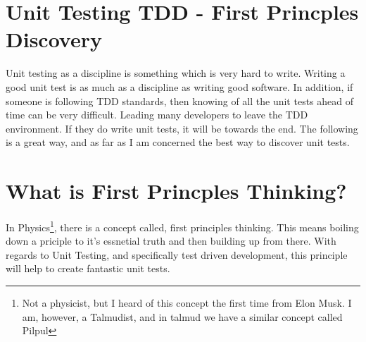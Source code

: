 \maketitle{}
\section{ Unit Testing TDD - First Princples Discovery }

Unit testing as a discipline is something which is very hard to write. Writing
a good unit test is as much as a discipline as writing good software. In
addition, if someone is following TDD standards, then knowing of all the unit
tests ahead of time can be very difficult. Leading many developers to leave the
TDD environment. If they do write unit tests, it will be towards the end. The
following is a great way, and as far as I am concerned the best way to discover
unit tests.

\section{ What is First Princples Thinking? }
In Physics\footnote{Not a physicist, but I heard of this concept the first time
from Elon Musk. I am, however, a Talmudist, and in talmud we have a similar
concept called Pilpul}, there is a concept called, first principles thinking.
This means boiling down a priciple to it's essnetial truth and then building up
from there. With regards to Unit Testing, and specifically test driven
development, this principle will help to create fantastic unit tests.
